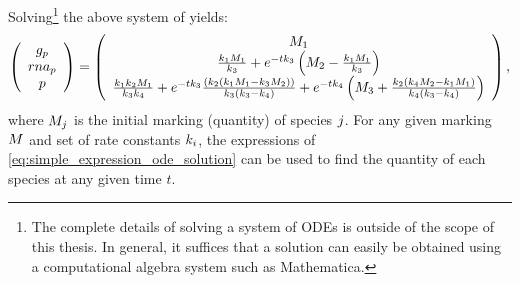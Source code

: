 Solving\footnote{The complete details of solving a system of ODEs is outside of the scope of this thesis. In general, it suffices that a solution can easily be obtained using a computational algebra system such as Mathematica\cite{Wolfram:11Mat}.} the above system of  yields:
\begin{gather}\label{eq:simple_expression_ode_solution}
    \left( \begin{array}{c}
        \con{g_p} \\
        \con{rna_p} \\
        \con{p}
    \end{array} \right) =
%
    \left( \begin{array}{c}
        \markmat_1 \\
        \frac{\condetx{1} \markmat_1}{\condetx{3}} + e^{-t \condetx{3}}\left( \markmat_2-\frac{\condetx{1} \markmat_1}{\condetx{3}} \right) \\
        \frac{\condetx{1} \condetx{2} \markmat_1}{\condetx{3} \condetx{4}} + e^{-t \condetx{3}}\frac{\left(\condetx{2} \left(\condetx{1} \markmat_1-\condetx{3} \markmat_2\right)\right)}{\condetx{3} \left(\condetx{3}-\condetx{4}\right)} + e^{-t \condetx{4}} \left(\markmat_3 + \frac{\condetx{2} \left(\condetx{4} \markmat_2-\condetx{1} \markmat_1\right)}{\condetx{4} \left(\condetx{3}-\condetx{4}\right)}\right)
    \end{array} \right),
\end{gather}
where $M_j$ is the initial marking (\ie quantity) of species $j$. For any given marking $M$ and set of rate constants $k_{i}$, the expressions of \eqref{eq:simple_expression_ode_solution} can be used to find the quantity of each species at any given time $t$.

